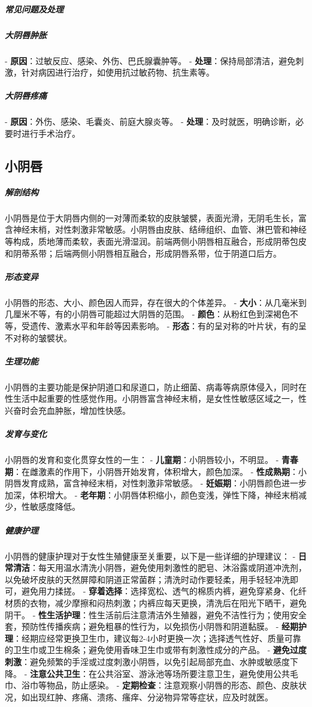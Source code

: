 \begin{enumerate}
\subparagraph{常见问题及处理}

\subparagraph{大阴唇肿胀}
- \textbf{原因}：过敏反应、感染、外伤、巴氏腺囊肿等。
- \textbf{处理}：保持局部清洁，避免刺激，针对病因进行治疗，如使用抗过敏药物、抗生素等。

\subparagraph{大阴唇疼痛}
- \textbf{原因}：外伤、感染、毛囊炎、前庭大腺炎等。
- \textbf{处理}：及时就医，明确诊断，必要时进行手术治疗。

\subsection{小阴唇}

\subparagraph{解剖结构}
小阴唇是位于大阴唇内侧的一对薄而柔软的皮肤皱襞，表面光滑，无阴毛生长，富含神经末梢，对性刺激非常敏感。小阴唇由皮肤、结缔组织、血管、淋巴管和神经等构成，质地薄而柔软，表面光滑湿润。前端两侧小阴唇相互融合，形成阴蒂包皮和阴蒂系带；后端两侧小阴唇相互融合，形成阴唇系带，位于阴道口后方。

\subparagraph{形态变异}
小阴唇的形态、大小、颜色因人而异，存在很大的个体差异。
- \textbf{大小}：从几毫米到几厘米不等，有的小阴唇可能超过大阴唇的范围。
- \textbf{颜色}：从粉红色到深褐色不等，受遗传、激素水平和年龄等因素影响。
- \textbf{形态}：有的呈对称的叶片状，有的呈不对称的皱襞状。

\subparagraph{生理功能}
小阴唇的主要功能是保护阴道口和尿道口，防止细菌、病毒等病原体侵入，同时在性生活中起重要的性感觉作用。小阴唇富含神经末梢，是女性性敏感区域之一，性兴奋时会充血肿胀，增加性快感。

\subparagraph{发育与变化}
小阴唇的发育和变化贯穿女性的一生：
- \textbf{儿童期}：小阴唇较小，不明显。
- \textbf{青春期}：在雌激素的作用下，小阴唇开始发育，体积增大，颜色加深。
- \textbf{性成熟期}：小阴唇发育成熟，富含神经末梢，对性刺激非常敏感。
- \textbf{妊娠期}：小阴唇颜色进一步加深，体积增大。
- \textbf{老年期}：小阴唇体积缩小，颜色变浅，弹性下降，神经末梢减少，性敏感度降低。

\subparagraph{健康护理}
小阴唇的健康护理对于女性生殖健康至关重要，以下是一些详细的护理建议：
- \textbf{日常清洁}：每天用温水清洗小阴唇，避免使用刺激性的肥皂、沐浴露或阴道冲洗剂，以免破坏皮肤的天然屏障和阴道正常菌群；清洗时动作要轻柔，用手轻轻冲洗即可，避免用力揉搓。
- \textbf{穿着选择}：选择宽松、透气的棉质内裤，避免穿紧身、化纤材质的衣物，减少摩擦和闷热刺激；内裤应每天更换，清洗后在阳光下晒干，避免阴干。
- \textbf{性生活护理}：性生活前后注意清洁外生殖器，避免不洁性行为；使用安全套，预防性传播疾病；避免粗暴的性行为，以免损伤小阴唇和阴道黏膜。
- \textbf{经期护理}：经期应经常更换卫生巾，建议每2-4小时更换一次；选择透气性好、质量可靠的卫生巾或卫生棉条；避免使用香味卫生巾或带有刺激性成分的产品。
- \textbf{避免过度刺激}：避免频繁的手淫或过度刺激小阴唇，以免引起局部充血、水肿或敏感度下降。
- \textbf{注意公共卫生}：在公共浴室、游泳池等场所要注意卫生，避免使用公共毛巾、浴巾等物品，防止感染。
- \textbf{定期检查}：注意观察小阴唇的形态、颜色、皮肤状况，如出现红肿、疼痛、溃疡、瘙痒、分泌物异常等症状，应及时就医。


\end{enumerate}
